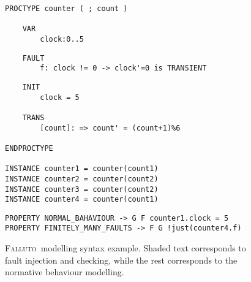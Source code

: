 \documentclass{llncs2e/llncs}
\newcommand{\fallutoSp}{\nohyphens{\textsc{Falluto~}}}  %
\begin{document}
\vspace{-0.5cm}
\begin{figure}[H]
    \centering
\begin{framed}
\begin{verbatim}
PROCTYPE counter ( ; count )

    VAR
        clock:0..5
\end{verbatim}
\vspace{-0.5cm}
\begin{shaded}
\vspace{-0.5cm}
\begin{verbatim}
    FAULT
        f: clock != 0 -> clock'=0 is TRANSIENT
\end{verbatim}
\vspace{-0.5cm}
\end{shaded}
\vspace{-0.5cm}
\begin{verbatim}
    INIT
        clock = 5

    TRANS
        [count]: => count' = (count+1)%6

ENDPROCTYPE

INSTANCE counter1 = counter(count1)
INSTANCE counter2 = counter(count2)
INSTANCE counter3 = counter(count2)
INSTANCE counter4 = counter(count1)
\end{verbatim}
\vspace{-0.5cm}
\begin{shaded}
\vspace{-0.5cm}
\begin{verbatim}
PROPERTY NORMAL_BAHAVIOUR -> G F counter1.clock = 5
PROPERTY FINITELY_MANY_FAULTS -> F G !just(counter4.f)
\end{verbatim}
\vspace{-0.5cm}
\end{shaded}
\vspace{-0.5cm}
\end{framed}
    \caption{\fallutoSp modelling syntax example. Shaded text corresponds to fault injection and checking, while the rest corresponds to the normative behaviour modelling.}
\label{example}
\end{figure}
\end{document}
